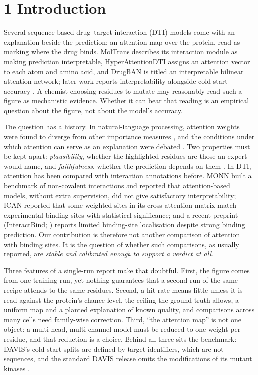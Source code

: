\documentclass[
  11pt,
]{article}
\begin{document}
\section{1 Introduction}\label{introduction}

Several sequence-based drug--target interaction (DTI) models come with an explanation beside the prediction: an attention map over the protein, read as marking where the drug binds. MolTrans \citep{Huang2021} describes its interaction module as making prediction interpretable, HyperAttentionDTI \citep{Zhao2022} assigns an attention vector to each atom and amino acid, and DrugBAN \citep{Bai2023} is titled an interpretable bilinear attention network; later work reports interpretability alongside cold-start accuracy \citep[for example GPS-DTI;][]{Xiong2025}. A chemist choosing residues to mutate may reasonably read such a figure as mechanistic evidence. Whether it can bear that reading is an empirical question about the figure, not about the model's accuracy.

The question has a history. In natural-language processing, attention weights were found to diverge from other importance measures \citep{Jain2019,Serrano2019}, and the conditions under which attention can serve as an explanation were debated \citep{Wiegreffe2019}. Two properties must be kept apart: \emph{plausibility}, whether the highlighted residues are those an expert would name, and \emph{faithfulness}, whether the prediction depends on them \citep{DeYoung2020}. In DTI, attention has been compared with interaction annotations before. MONN \citep{Li2020} built a benchmark of non-covalent interactions and reported that attention-based models, without extra supervision, did not give satisfactory interpretability; ICAN \citep{Kurata2022} reported that some weighted sites in its cross-attention matrix match experimental binding sites with statistical significance; and a recent preprint (InteractBind; \citealp{Meng2026}) reports limited binding-site localisation despite strong binding prediction. Our contribution is therefore not another comparison of attention with binding sites. It is the question of whether such comparisons, as usually reported, are \emph{stable and calibrated enough to support a verdict at all}.

Three features of a single-run report make that doubtful. First, the figure comes from one training run, yet nothing guarantees that a second run of the same recipe attends to the same residues. Second, a hit rate means little unless it is read against the protein's chance level, the ceiling the ground truth allows, a uniform map and a planted explanation of known quality, and comparisons across many cells need family-wise correction. Third, ``the attention map'' is not one object: a multi-head, multi-channel model must be reduced to one weight per residue, and that reduction is a choice. Behind all three sits the benchmark: DAVIS's cold-start splits are defined by target identifiers, which are not sequences, and the standard DAVIS release omits the modifications of its mutant kinases \citep[][preprint]{Wu2025}.
\end{document}
